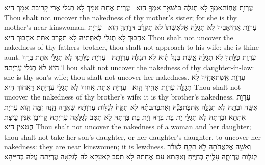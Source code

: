 {עֶרְוַ֥ת אֲחֽוֹת\maqqaf אִמְּךָ֖ לֹ֣א תְגַלֵּ֑ה כִּֽי\maqqaf שְׁאֵ֥ר אִמְּךָ֖ הִֽוא׃ \setuma }
{עֶרְיַת אֲחָת אִמָּךְ לָא תְגַלֵּי אֲרֵי קָרִיבַת אִמָּךְ הִיא׃}
{Thou shalt not uncover the nakedness of thy mother’s sister; for she is thy mother’s near kinswoman.}{}
{עֶרְוַ֥ת אֲחִֽי\maqqaf אָבִ֖יךָ לֹ֣א תְגַלֵּ֑ה אֶל\maqqaf אִשְׁתּוֹ֙ לֹ֣א תִקְרָ֔ב דֹּדָֽתְךָ֖ הִֽוא׃ \setuma }
{עֶרְיַת אַחְבּוּךְ לָא תְגַלֵּי לְאִתְּתֵיהּ לָא תִקְרַב אִתַּת אַחְבּוּךְ הִיא׃}
{Thou shalt not uncover the nakedness of thy fathers brother, thou shalt not approach to his wife: she is thine aunt.}{}
{עֶרְוַ֥ת כַּלָּֽתְךָ֖ לֹ֣א תְגַלֵּ֑ה אֵ֤שֶׁת בִּנְךָ֙ הִ֔וא לֹ֥א תְגַלֶּ֖ה עֶרְוָתָֽהּ׃ \setuma }
{עֶרְיַת כַּלְּתָךְ לָא תְגַלֵּי אִתַּת בְּרָךְ הִיא לָא תְגַלֵּי עֶרְיְתַהּ׃}
{Thou shalt not uncover the nakedness of thy daughter-in-law: she is thy son’s wife; thou shalt not uncover her nakedness.}{}
{עֶרְוַ֥ת אֵֽשֶׁת\maqqaf אָחִ֖יךָ לֹ֣א תְגַלֵּ֑ה עֶרְוַ֥ת אָחִ֖יךָ הִֽוא׃ \setuma }
{עֶרְיַת אִתַּת אֲחוּךְ לָא תְגַלֵּי עֶרְיְתָא דַּאֲחוּךְ הִיא׃}
{Thou shalt not uncover the nakedness of thy brother’s wife: it is thy brother’s nakedness.}{}
{עֶרְוַ֥ת אִשָּׁ֛ה וּבִתָּ֖הּ לֹ֣א תְגַלֵּ֑ה אֶֽת\maqqaf בַּת\maqqaf בְּנָ֞הּ וְאֶת\maqqaf בַּת\maqqaf בִּתָּ֗הּ לֹ֤א תִקַּח֙ לְגַלּ֣וֹת עֶרְוָתָ֔הּ שַׁאֲרָ֥ה הֵ֖נָּה זִמָּ֥ה הִֽוא׃}
{עֶרְיַת אִתְּתָא וּבְרַתַּהּ לָא תְגַלֵּי יָת בַּת בְּרַהּ וְיָת בַּת בְּרַתַּהּ לָא תִסַּב לְגַלָּאָה עֶרְיְתַהּ קָרִיבָן אִנִּין עֵיצַת חֲטִאין הִיא׃}
{Thou shalt not uncover the nakedness of a woman and her daughter; thou shalt not take her son’s daughter, or her daughter’s daughter, to uncover her nakedness: they are near kinswomen; it is lewdness.}{}
{וְאִשָּׁ֥ה אֶל\maqqaf אֲחֹתָ֖הּ לֹ֣א תִקָּ֑ח לִצְרֹ֗ר לְגַלּ֧וֹת עֶרְוָתָ֛הּ עָלֶ֖יהָ בְּחַיֶּֽיהָ׃}
{וְאִתְּתָא עִם אֲחָתַהּ לָא תִסַּב לְאַעָקָא לַהּ לְגַלָּאָה עֶרְיְתַהּ עֲלַהּ בְּחַיַּיהָא׃}
